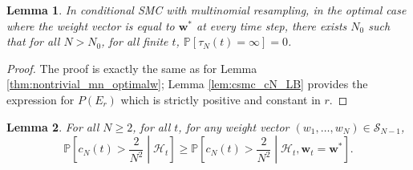 \documentclass{article}
\newtheorem{lemma}{Lemma}
\newcommand{\PR}{\mathbb{P}}
\newcommand{\1}[1]{\mathbb{I}_{#1}}
\begin{document}
 
\begin{lemma}\label{thm:nontrivial_csmc_optimalw}
In conditional SMC with multinomial resampling, in the optimal case where the weight vector is equal to $\mathbf{w}^*$ at every time step, there exists $N_0$ such that for all $N>N_0$, for all finite $t$, $\PR[\tau_N(t) = \infty] =0$.
\end{lemma}

\begin{proof}
The proof is exactly the same as for Lemma \ref{thm:nontrivial_mn_optimalw}; Lemma \ref{lem:csmc_cN_LB} provides the expression for $P(E_r)$ which is strictly positive and constant in $r$.
\end{proof}


\begin{lemma}\label{lem:csmc_optimal_w}
For all $N\geq 2$, for all $t$, for any weight vector $(w_1, \dots, w_N) \in \mathcal{S}_{N-1}$,
\begin{equation*}
\PR \left[c_N(t) > \frac{2}{N^2} \middle| \mathcal{H}_t \right]
\geq \PR \left[c_N(t) > \frac{2}{N^2} \middle| \mathcal{H}_t, \mathbf{w}_t = \mathbf{w}^* \right].
\end{equation*}
\end{lemma}
\end{document}
